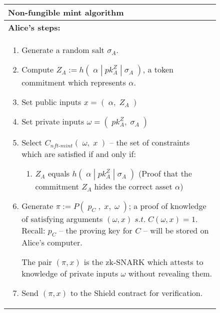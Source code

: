 \begin{figure}[hp]
	\begin{center}
		\begin{framed}
      \begin{tabular}{p{16cm}}	
        \textbf{Non-fungible mint algorithm} \\
        \midrule
        \textbf{Alice's steps:}\\
        \begin{enumerate}
				  \item Generate a random salt $\sigma_{A}$.
				  \item Compute $Z_A := h(\;\alpha\;|\;pk^Z_A\;|\;\sigma_{A}\;)$, a token commitment which represents $\alpha$. 
          \item Set public inputs $x = (\;\alpha,\;Z_A\;)$
          \item Set private inputs $\omega = (\;pk_A^Z,\;\sigma_{A}\;)$
          \item Select $C_{nft\mbox{-}mint}(\;\omega,\;x\;)$ -- the set of constraints which are satisfied if and only if:
          \begin{enumerate}
            \item $Z_A$ equals $h(\;\alpha\;|\;pk_A^Z\;|\;\sigma_A\;)$ (Proof that the commitment $Z_A$ hides the correct asset $\alpha$)
          \end{enumerate}
          \item Generate $\pi := P(\;p_C\;,\;x,\;\omega\;)$; a proof of knowledge of satisfying arguments $(\omega, x)\;s.t.\;C(\omega, x) = 1$. Recall: $p_C$ -- the proving key for $C$ -- will be stored on Alice's computer.
           
          The pair $(\pi, x)$ is the zk-SNARK which attests to knowledge of private inputs $\omega$ without revealing them.
          \item Send $(\pi, x)$ to the Shield contract for verification.
           

\end{enumerate}
\end{tabular}
\end{framed}
\end{center}
\end{figure}
